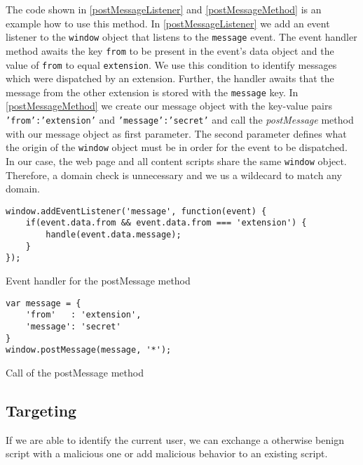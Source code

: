 			The code shown in \autoref{postMessageListener} and \autoref{postMessageMethod} is an example how to use this method. In \autoref{postMessageListener} we add an event listener to the \texttt{window} object that listens to the \texttt{message} event. The event handler method awaits the key \texttt{from} to be present in the event's data object and the value of \texttt{from} to equal \texttt{extension}. We use this condition to identify messages which were dispatched by an extension. Further, the handler awaits that the message from the other extension is stored with the \texttt{message} key. In \autoref{postMessageMethod} we create our message object with the key-value pairs \texttt{'from':'extension'} and \texttt{'message':'secret'} and call the \textit{postMessage} method with our message object as first parameter. The second parameter defines what the origin of the \texttt{window} object must be in order for the event to be dispatched. In our case, the web page and all content scripts share the same \texttt{window} object. Therefore, a domain check is unnecessary and we us a wildecard to match any domain.
			
			\begin{code}
				\begin{lstlisting}
window.addEventListener('message', function(event) {
	if(event.data.from && event.data.from === 'extension') {
	    handle(event.data.message);
	}
});
\end{lstlisting}
				\caption{Event handler for the postMessage method}
				\label{postMessageListener}
			\end{code}
			
			\begin{code}
				\begin{lstlisting}
var message = {
	'from'   : 'extension',
	'message': 'secret'
}
window.postMessage(message, '*');
\end{lstlisting}
				\caption{Call of the postMessage method}
				\label{postMessageMethod}
			\end{code}
	
	\subsection{Targeting}
	
		If we are able to identify the current user, we can exchange a otherwise benign script with a malicious one or add malicious behavior to an existing script. 
	
